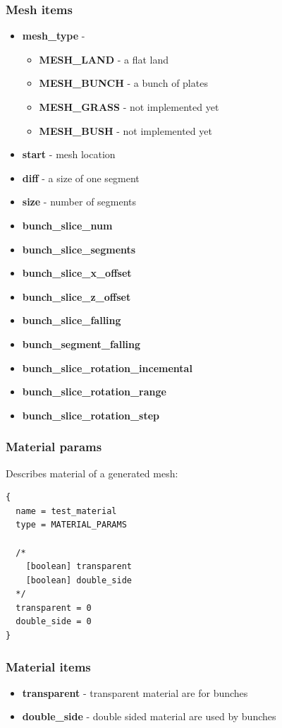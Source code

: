 \documentclass[9pt]{article}
\begin{document}
\subsubsection*{Mesh items}
\begin{itemize}
\item{\bf mesh\_type} - 
\begin{itemize}
\item{\bf MESH\_LAND} - a flat land
\item{\bf MESH\_BUNCH} - a bunch of plates
\item{\bf MESH\_GRASS} - not implemented yet
\item{\bf MESH\_BUSH} - not implemented yet
\end{itemize}
\item{\bf start} - mesh location
\item{\bf diff} - a size of one segment
\item{\bf size} - number of segments
\item{\bf bunch\_slice\_num}
\item{\bf bunch\_slice\_segments}
\item{\bf bunch\_slice\_x\_offset}
\item{\bf bunch\_slice\_z\_offset}
\item{\bf bunch\_slice\_falling}
\item{\bf bunch\_segment\_falling}
\item{\bf bunch\_slice\_rotation\_incemental}
\item{\bf bunch\_slice\_rotation\_range}
\item{\bf bunch\_slice\_rotation\_step}
\end{itemize}

\subsubsection{Material params}
Describes material of a generated mesh:
\begin{verbatim}
{
  name = test_material
  type = MATERIAL_PARAMS
  
  /*
    [boolean] transparent
    [boolean] double_side
  */
  transparent = 0
  double_side = 0  
}
\end{verbatim}
\subsubsection*{Material items}
\begin{itemize}
\item{\bf transparent} - transparent material are for bunches
\item{\bf double\_side} - double sided material are used by bunches
\end{itemize}
\end{document}
